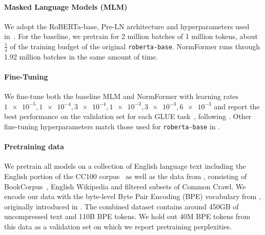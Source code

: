 \documentclass{article} %
\begin{document}
\paragraph{Masked Language Models (MLM)}
We adopt the RoBERTa-base, Pre-LN architecture and hyperparameters used in~\citet{liu2019roberta}.
For the baseline, we pretrain for 2 million batches of 1 million tokens, about $\frac{1}{4}$ of the training budget of the original \texttt{roberta-base}.
NormFormer runs through 1.92 million batches in the same amount of time.

\paragraph{Fine-Tuning}
We fine-tune both the baseline MLM and NormFormer with learning rates
$\num{1e-5}, \num{1e-4}, \num{3e-4}, \num{1e-3}, \num{3e-3}, \num{6e-3}$ and report the best performance on the validation set for each GLUE task~\citep{wang2019glue}, following \citet{liu2019roberta}.
Other fine-tuning hyperparameters match those used for \texttt{roberta-base} in \citet{liu2019roberta}.

\paragraph{Pretraining data}
We pretrain all models on a collection of English language text including the English portion of the CC100 corpus~\citep{conneau2020unsupervised} as well as the data from \citet{liu2019roberta}, consisting of BookCorpus~\citep{zhu2015bookcorpus}, English Wikipedia and filtered subsets of Common Crawl.
We encode our data with the byte-level Byte Pair Encoding (BPE) vocabulary from \citet{liu2019roberta}, originally introduced in \citet{radford2019language}.
The combined dataset contains around 450GB of uncompressed text and 110B BPE tokens.
We hold out 40M BPE tokens from this data as a validation set on which we report pretraining perplexities.

\end{document}
